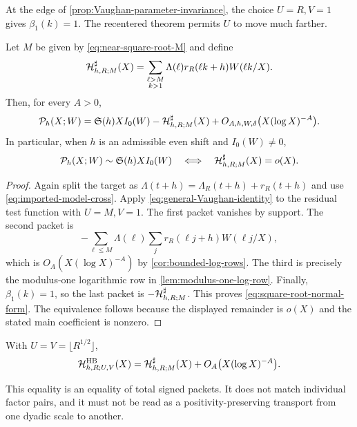 At the edge of \cref{prop:Vaughan-parameter-invariance}, the choice
$U=R,V=1$ gives $\beta_1(k)=1$.  The recentered theorem permits $U$ to
move much farther.

\begin{theorem}
\label{thm:square-root-normal-form}
Let $M$ be given by \eqref{eq:near-square-root-M} and define
\begin{equation}
 \mathcal H^\sharp_{h,R;M}(X)=
 \sum_{\substack{\ell>M\\k>1}}
 \Lambda(\ell)r_R(\ell k+h)W(\ell k/X).
 \label{eq:Hsharp-definition}
\end{equation}
Then, for every $A>0$,
\begin{equation}
 \mathcal P_h(X;W)=\mathfrak S(h)XI_0(W)
 -\mathcal H^\sharp_{h,R;M}(X)
 +O_{A,h,W,\delta}\bigl(X(\log X)^{-A}\bigr).
 \label{eq:square-root-normal-form}
\end{equation}
In particular, when $h$ is an admissible even shift and $I_0(W)\ne0$,
\begin{equation}
 \mathcal P_h(X;W)\sim\mathfrak S(h)XI_0(W)
 \quad\Longleftrightarrow\quad
 \mathcal H^\sharp_{h,R;M}(X)=o(X).
 \label{eq:Hsharp-gate}
\end{equation}
\end{theorem}

\begin{proof}
Again split the target as $\Lambda(t+h)=\Lambda_R(t+h)+r_R(t+h)$ and
use \eqref{eq:imported-model-cross}.  Apply
\eqref{eq:general-Vaughan-identity} to the residual test function with
$U=M,V=1$.  The first packet vanishes by support.  The second packet is
\[
 -\sum_{\ell\le M}\Lambda(\ell)
 \sum_jr_R(\ell j+h)W(\ell j/X),
\]
which is $O_A(X(\log X)^{-A})$ by
\cref{cor:bounded-log-rows}.  The third is precisely the modulus-one
logarithmic row in \cref{lem:modulus-one-log-row}.  Finally,
$\beta_1(k)=1$, so the last packet is
$-\mathcal H^\sharp_{h,R;M}$.  This proves \eqref{eq:square-root-normal-form}.
The equivalence follows because the displayed remainder is $o(X)$ and
the stated main coefficient is nonzero.
\end{proof}

\begin{corollary}
\label{cor:two-hard-packets-equivalent}
With $U=V=\lfloor R^{1/2}\rfloor$,
\begin{equation}
 \mathcal H^{\rm HB}_{h,R;U,V}(X)
 =\mathcal H^\sharp_{h,R;M}(X)
 +O_A\bigl(X(\log X)^{-A}\bigr).
 \label{eq:packet-equivalence}
\end{equation}
\end{corollary}

This equality is an equality of total signed packets.  It does not match
individual factor pairs, and it must not be read as a positivity-preserving
transport from one dyadic scale to another.
